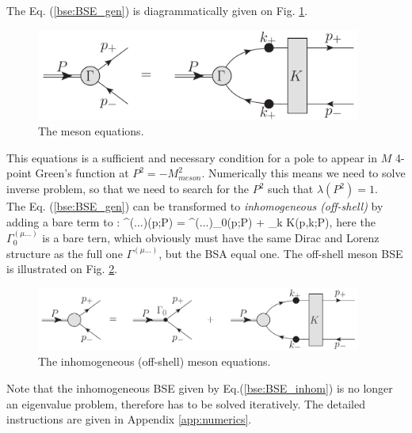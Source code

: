  The Eq. (\ref{bse:BSE_gen}) is diagrammatically given on Fig. \ref{fig:BSE_gen}.
\begin{figure}[H]
\tiny
 \begin{center}
  \includegraphics[width=0.95\textwidth]{figures/BSE_gen}
 \end{center}
 \caption{\footnotesize The meson \BS equations. }\label{fig:BSE_gen} 
\end{figure}
This equations is a sufficient and necessary condition for a pole to appear in $M$ 4-point Green's function at $P^2=-M^2_{meson}$. Numerically this means we need to solve inverse problem, so that we need to search for the $P^2$ such that $\lambda(P^2)=1$. \\ 

The Eq. (\ref{bse:BSE_gen}) can be transformed to \textit{inhomogeneous (off-shell)} by adding a bare term to \BSE:
\beqa
	\Gamma^{(\mu...)}(p;P) = \Gamma^{(\mu...)}_{0}(p;P) + \int_k K(p,k;P)\;,
	\label{bse:BSE_inhom}
\eeqa
here the $\Gamma^{(\mu...)}_{0}$ is a bare tern, which obviously must have the same Dirac and Lorenz structure as the full one $\Gamma^{(\mu...)}$, but the BSA equal one. The off-shell meson BSE is illustrated on Fig. \ref{fig:BSE_gen_offshell}.
\begin{figure}[H]
\tiny
 \begin{center}
  \includegraphics[width=0.95\textwidth]{figures/BSE_gen_offshell}
 \end{center}
 \caption{\footnotesize The inhomogeneous (off-shell) meson \BS equations. }\label{fig:BSE_gen_offshell} 
\end{figure}
Note that the inhomogeneous BSE given by Eq.(\ref{bse:BSE_inhom}) is no longer an eigenvalue problem, therefore has to be solved iteratively. The detailed instructions are given in Appendix \ref{app:numerics}.

